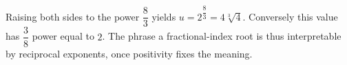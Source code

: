 Raising both sides to the power $\dfrac{8}{3}$ yields $u=2^{\dfrac{8}{3}}=4\sqrt[3]{4}$. Conversely this value has $\dfrac{3}{8}$ power equal to $2$. The phrase a fractional-index root is thus interpretable by reciprocal exponents, once positivity fixes the meaning.
